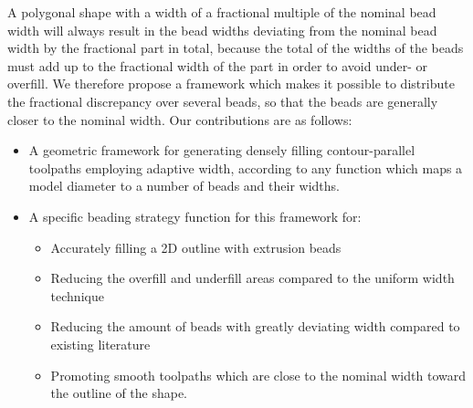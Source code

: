 A polygonal shape with a width of a fractional multiple of the nominal bead width will always result in the bead widths deviating from the nominal bead width by the fractional part in total,
because the total of the widths of the beads must add up to the fractional width of the part in order to avoid under- or overfill.
We therefore propose a framework which makes it possible to distribute the fractional discrepancy over several beads, so that the beads are generally closer to the nominal width.
Our contributions are as follows:
\begin{itemize}
\item A geometric framework for generating densely filling contour-parallel toolpaths employing adaptive width, according to any function which maps a model diameter to a number of beads and their widths.
\item A specific beading strategy function for this framework for:
\begin{itemize}
\item Accurately filling a 2D outline with extrusion beads
\item Reducing the overfill and underfill areas compared to the uniform width technique
\item Reducing the amount of beads with greatly deviating width compared to existing literature
\item Promoting smooth toolpaths which are close to the nominal width toward the outline of the shape.
\end{itemize}
\end{itemize}





